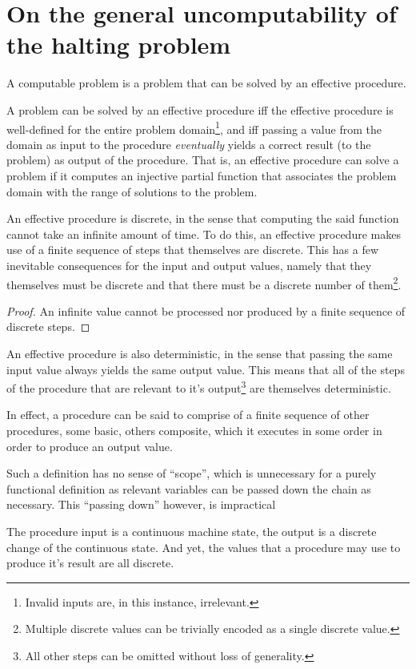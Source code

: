 \chapter{On the general uncomputability of the halting problem}

A computable problem is a problem that can be solved by an effective procedure.

A problem can be solved by an effective procedure iff the effective procedure
is well-defined for the entire problem domain\footnote{Invalid inputs are, in
this instance, irrelevant.}, and iff passing a value from the domain as input
to the procedure \emph{eventually} yields a correct result (to the problem) as
output of the procedure. That is, an effective procedure can solve a problem if
it computes an injective partial function that associates the problem domain
with the range of solutions to the problem.

An effective procedure is discrete, in the sense that computing the said
function cannot take an infinite amount of time. To do this, an effective
procedure makes use of a finite sequence of steps that themselves are discrete.
This has a few inevitable consequences for the input and output values, namely
that they themselves must be discrete and that there must be a discrete number
of them\footnote{Multiple discrete values can be trivially encoded as a single
discrete value.}.

\begin{proof} An infinite value cannot be processed nor produced by a finite
sequence of discrete steps.\end{proof}

An effective procedure is also deterministic, in the sense that passing the
same input value always yields the same output value. This means that all of
the steps of the procedure that are relevant to it's output\footnote{All other
steps can be omitted without loss of generality.} are themselves deterministic.

In effect, a procedure can be said to comprise of a finite sequence of other
procedures, some basic, others composite, which it executes in some order in
order to produce an output value.

Such a definition has no sense of ``scope'', which is unnecessary for a purely
functional definition as relevant variables can be passed down the chain as
necessary. This ``passing down'' however, is impractical



The procedure input is a continuous machine state, the output is a discrete
change of the continuous state. And yet, the values that a procedure may use to
produce it's result are all discrete.

